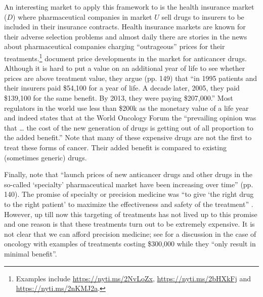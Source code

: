 \documentclass[a4paper,12pt]{article}
\begin{document}
An interesting market to apply this framework to is the health insurance market (\(D\)) where pharmaceutical companies in market \(U\) sell drugs to insurers to be included in their insurance contracts. Health insurance markets are known for their adverse selection problems and almost daily there are stories in the news about pharmaceutical companies charging ``outrageous'' prices for their treatments.\footnote{Examples include \url{https://nyti.ms/2NvLoZx}, \url{https://nyti.ms/2bHXkFj} and \url{https://nyti.ms/2nKMJ2a}.} \cite{Howard2015} document price developments in the market for anticancer drugs. Although it is hard to put a value on an additional year of life to see whether prices are above treatment value, they argue (pp. 149) that ``in 1995 patients and their insurers paid \$54,100 for a year of life. A decade later, 2005, they paid \$139,100 for the same benefit. By 2013, they were paying \$207,000.'' Most regulators in the world use less than \$200k as the monetary value of a life year and indeed \cite{cavalli-2013-appeal-to} states that at the World Oncology Forum the ``prevailing opinion was that \ldots{} the cost of the new generation of drugs is getting out of all proportion to the added benefit.'' Note that many of these expensive drugs are not the first to treat these forms of cancer. Their added benefit is compared to existing (sometimes generic) drugs.

Finally, \cite{Howard2015} note that ``launch prices of new anticancer drugs and other drugs in the so-called `specialty' pharmaceutical market have been increasing over time'' (pp. 140). The promise of specialty or precision medicine was ``to give `the right drug to the right patient' to maximize the effectiveness and safety of the treatment'' \citep{Garattini2015}. However, up till now this targeting of treatments has not lived up to this promise and one reason is that these treatments turn out to be extremely expensive. It is not clear that we can afford precision medicine; see \cite{Doble2016} for a discussion in the case of oncology with examples of treatments costing \$300,000 while they ``only result in minimal benefit''.
\end{document}
